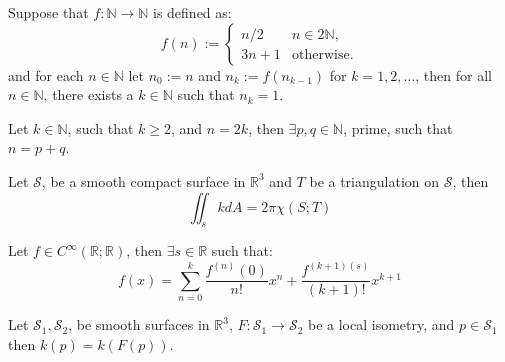 \documentclass{article}
\newcommand{\N}{\mathbb{N}}
\newcommand{\R}{\mathbb{R}}
\begin{document}
  \begin{multicols}{3}
    \begin{tcolorbox}[colback=bg, colframe=bg_alt, coltitle=fg, title=Collatz' Conjecture, fonttitle=\bfseries]
      \color{fg}
      Suppose that $f: \N \to \N$ is defined as:
      \begin{equation*}
        f(n) := \begin{cases}
                  n / 2 & n \in 2\N, \\
                  3n + 1 & \textrm{otherwise.}
                \end{cases}
      \end{equation*}
      and for each $n \in \N$ let $n_{0} := n$ and $n_{k} := f(n_{k-1})$ for $k = 1, 2, \ldots$, then for all $n \in \N$, there exists a $k \in \N$ such that $n_{k} = 1$.
    \end{tcolorbox}

    \begin{tcolorbox}[colback=bg, colframe=bg_alt, coltitle=fg, title=Goldbach's Conjecture, fonttitle=\bfseries]
      \color{fg}
      Let $k \in \N$, such that $k \geq 2$, and $n = 2k$, then $\exists p, q \in \N$, prime, such that $n = p + q$.
    \end{tcolorbox}

    \begin{tcolorbox}[colback=bg, colframe=bg_alt, coltitle=fg, title=Gauss-Bonnet Theorem, fonttitle=\bfseries]
      \color{fg}
      Let $\mathcal{S}$, be a smooth compact surface in $\R^{3}$ and $T$ be a triangulation on $\mathcal{S}$, then
      \begin{equation*}
        \iint_{s} k dA = 2\pi \chi(S; T)
      \end{equation*}
    \end{tcolorbox}

    \begin{tcolorbox}[colback=bg, colframe=bg_alt, coltitle=fg, title=Taylor's Theorem, fonttitle=\bfseries]
      \color{fg}
      Let $f \in C^{\infty}(\R; \R)$, then $\exists s \in \R$ such that:
      \begin{equation*}
        f(x) = \sum^{k}_{n = 0} \frac{f^{(n)}(0)}{n!}x^{n} + \frac{f^{(k + 1)(s)}}{(k + 1)!}x^{k + 1}
      \end{equation*}
    \end{tcolorbox}

    \begin{tcolorbox}[colback=bg, colframe=bg_alt, coltitle=fg, title=Theorema Egregium, fonttitle=\bfseries]
      \color{fg}
      Let $\mathcal{S}_{1}, \mathcal{S}_{2}$, be smooth surfaces in $\R^{3}$, $F: \mathcal{S}_{1} \to \mathcal{S}_{2}$ be a local isometry, and $p \in \mathcal{S}_{1}$ then $k(p) = k(F(p))$.
    \end{tcolorbox}


\end{multicols}
\end{document}

